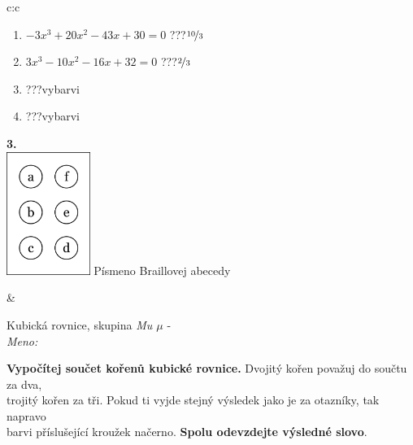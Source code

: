 \documentclass[10pt]{report}
\begin{document}
\begin{tabular}{c:c}
\begin{minipage}[c][104.5mm][t]{0.5\linewidth}
\begin{center}
\begin{minipage}{0.79\linewidth}
\begin{center}
\begin{varwidth}{\linewidth}
\begin{enumerate}
\item $-3x^3+20x^2-43x+30=0$\quad \dotfill\; ???\;\dotfill \quad $\nicefrac{10}{3}$
\item $3x^3-10x^2-16x+32=0$\quad \dotfill\; ???\;\dotfill \quad $\nicefrac{2}{3}$
\item \quad \dotfill\; ???\;\dotfill \quad vybarvi
\item \quad \dotfill\; ???\;\dotfill \quad vybarvi
\end{enumerate}
\end{varwidth}
\end{center}
\end{minipage}
\begin{minipage}{0.20\linewidth}
\begin{center}
{\Huge\bfseries 3.} \\[2mm]
\includegraphics[height=40mm]{../images/braille.png}
{\small Písmeno Braillovej abecedy}
\end{center}
\end{minipage}
\end{center}
\end{minipage}
&
\begin{minipage}[c][104.5mm][t]{0.5\linewidth}
\begin{center}
\vspace{7mm}
{\huge Kubická rovnice, skupina \textit{Mu $\mu$} -}\\[5mm]
\textit{Meno:}\phantom{xxxxxxxxxxxxxxxxxxxxxxxxxxxxxxxxxxxxxxxxxxxxxxxxxxxxxxxxxxxxxxxxx}\\[5mm]
\begin{minipage}{0.95\linewidth}
\textbf{Vypočítej součet kořenů kubické rovnice.} Dvojitý kořen považuj do součtu za dva,\\trojitý kořen za tři. Pokud ti vyjde stejný výsledek jako je za otazníky, tak napravo\\barvi příslušející kroužek načerno. \textbf{Spolu odevzdejte výsledné slovo}.
\end{minipage}
\\[1mm]
\begin{minipage}{0.79\linewidth}

\end{minipage}
\end{center}
\end{minipage}
\end{tabular}
\end{document}
